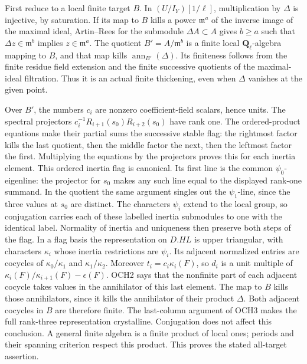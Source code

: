 \documentclass[11pt,a4paper]{article}
\numberwithin{equation}{section}
\theoremstyle{remark}\newtheorem{remark}[theorem]{Remark}
\begin{document}
First reduce to a local finite target \(B\).  In
\((U/I_Y)[1/\ell]\), multiplication by \(\Delta\) is
injective, by saturation.  If its map to \(B\) kills a power
\(\mathfrak m^a\) of the inverse image of the maximal ideal,
Artin--Rees for the submodule \(\Delta A\subset A\) gives
\(b\ge a\) such that
\(\Delta z\in\mathfrak m^b\) implies
\(z\in\mathfrak m^a\).  The quotient
\(B'=A/\mathfrak m^b\) is a finite local
\(\mathbf Q_\ell\)-algebra mapping to \(B\), and that map
kills \(\operatorname{ann}_{B'}(\Delta)\).  Its finiteness
follows from the finite residue field extension and the finite
successive quotients of the maximal-ideal filtration.  Thus it is
an actual finite thickening, even when \(\Delta\) vanishes
at the given point.

Over \(B'\), the numbers \(c_i\) are nonzero coefficient-field
scalars, hence units.  The spectral projectors
\(c_i^{-1}R_{i+1}(s_0)R_{i+2}(s_0)\) have rank one.
The ordered-product equations make their partial sums the successive
stable flag: the rightmost factor kills the last quotient, then the
middle factor the next, then the leftmost factor the first.
Multiplying the equations by the projectors proves this for each
inertia element.  This ordered inertia flag is canonical.  Its first
line is the common \(\psi_0\)-eigenline: the projector for
\(s_0\) makes any such line equal to the displayed rank-one
summand.  In the quotient the same argument singles out the
\(\psi_1\)-line, since the three values at \(s_0\) are
distinct.  The characters \(\psi_i\) extend to the
local group, so conjugation carries each of these labelled inertia
submodules to one with the identical label.  Normality of inertia
and uniqueness then preserve both steps of the flag.
In a flag basis the representation on \(D.HL\) is upper triangular, with characters
\(\kappa_i\) whose inertia restrictions are \(\psi_i\).
Its adjacent normalized entries are cocycles of
\(\kappa_0/\kappa_1\) and \(\kappa_1/\kappa_2\).
Moreover \(t_i=c_i\kappa_i(F)\), so \(d_i\) is a unit
multiple of \(\kappa_i(F)/\kappa_{i+1}(F)-\epsilon(F)\).
OCH2 says that the nonfinite part of each adjacent cocycle takes
values in the annihilator of this last element.  The map to \(B\)
kills those annihilators, since it kills the annihilator of their
product \(\Delta\).  Both adjacent cocycles in \(B\) are
therefore finite.  The last-column argument of OCH3 makes the full
rank-three representation crystalline.  Conjugation does not affect
this conclusion.  A general finite algebra is a finite product of
local ones; periods and their spanning criterion respect this
product.  This proves the stated all-target assertion.
\end{document}
